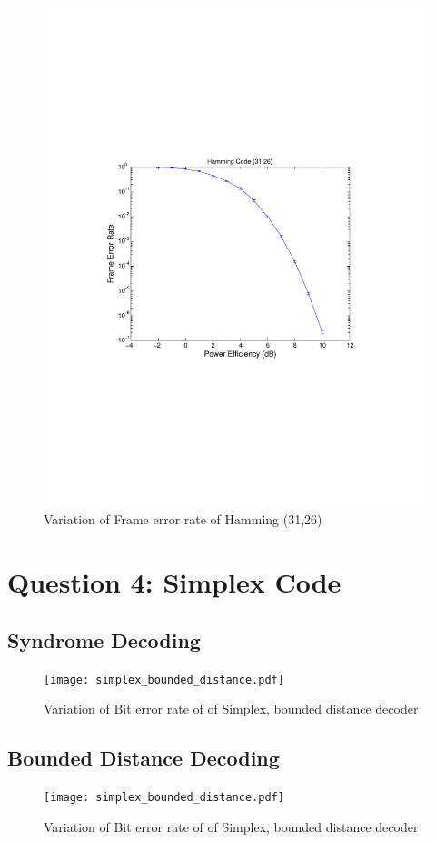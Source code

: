 \documentclass[11pt, english]{article}
\begin{document}
\begin{figure}[H]
    \centering
    \includegraphics[width=.8\textwidth]{hamming_31_26_fer.pdf}
    \caption{Variation of Frame error rate of Hamming (31,26)}
    \label{h31}
\end{figure}

\section{Question 4: Simplex Code}
\subsection{Syndrome Decoding}

\begin{figure}[H]
    \centering
    \texttt{[image: simplex\_bounded\_distance.pdf]}
    \caption{Variation of Bit error rate of of Simplex, bounded distance decoder}
    \label{sb}
\end{figure}

\subsection{Bounded Distance Decoding}
\begin{figure}[H]
    \centering
    \texttt{[image: simplex\_bounded\_distance.pdf]}
    \caption{Variation of Bit error rate of of Simplex, bounded distance decoder}
    \label{sb}
\end{figure}
\end{document}
